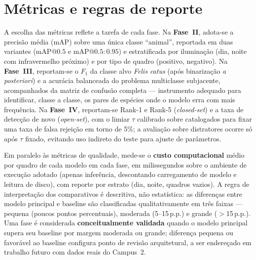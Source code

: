 \section{Métricas e regras de reporte}
\label{sec:metodologia-metricas}

A escolha das métricas reflete a tarefa de cada fase. Na \textbf{Fase~II}, adota-se a precisão média (mAP) sobre uma única classe ``animal'', reportada em duas variantes (mAP$@0.5$ e mAP$@0.5{:}0.95$) e estratificada por iluminação (dia, noite com infravermelho próximo) e por tipo de quadro (positivo, negativo). Na \textbf{Fase~III}, reportam-se o $F_1$ da classe alvo \emph{Felis catus} (após binarização \emph{a posteriori}) e a acurácia balanceada do problema multiclasse subjacente, acompanhados da matriz de confusão completa --- instrumento adequado para identificar, classe a classe, os pares de espécies onde o modelo erra com mais frequência. Na \textbf{Fase~IV}, reportam-se Rank-1 e Rank-5 (\emph{closed-set}) e a taxa de detecção de novo (\emph{open-set}), com o limiar $\tau$ calibrado sobre catalogados para fixar uma taxa de falsa rejeição em torno de 5\%; a avaliação sobre distratores ocorre só após $\tau$ fixado, evitando uso indireto do teste para ajuste de parâmetros.

Em paralelo às métricas de qualidade, mede-se o \textbf{custo computacional} médio por quadro de cada modelo em cada fase, em milissegundos sobre o ambiente de execução adotado (apenas inferência, descontando carregamento de modelo e leitura de disco), com reporte por estrato (dia, noite, quadros vazios). A regra de interpretação dos comparativos é descritiva, não estatística: as diferenças entre modelo principal e baseline são classificadas qualitativamente em três faixas --- pequena (poucos pontos percentuais), moderada (5--15\,p.p.) e grande ($>$15\,p.p.). Uma fase é considerada \textbf{conceitualmente validada} quando o modelo principal supera seu baseline por margem moderada ou grande; diferença pequena ou favorável ao baseline configura ponto de revisão arquitetural, a ser endereçado em trabalho futuro com dados reais do Campus~2.
